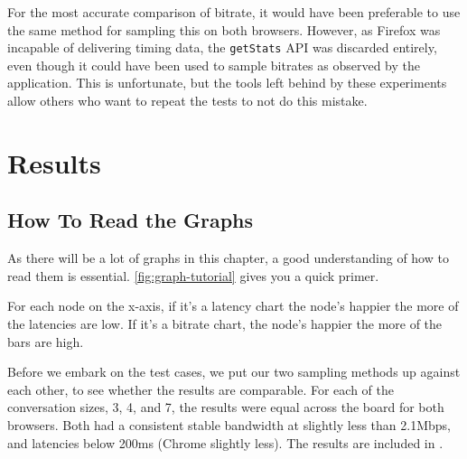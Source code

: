 For the most accurate comparison of bitrate, it would have been preferable to use the same method for sampling this on both browsers. However, as Firefox was incapable of delivering timing data, the \texttt{getStats} API was discarded entirely, even though it could have been used to sample bitrates as observed by the application. This is unfortunate, but the tools left behind by these experiments allow others who want to repeat the tests to not do this mistake.


\section{Results}

\subsection{How To Read the Graphs}

As there will be a lot of graphs in this chapter, a good understanding of how to read them is essential. \autoref{fig:graph-tutorial} gives you a quick primer.


For each node on the x-axis, if it's a latency chart the node's happier the more of the latencies are low. If it's a bitrate chart, the node's happier the more of the bars are high.

Before we embark on the test cases, we put our two sampling methods up against each other, to see whether the results are comparable. For each of the conversation sizes, 3, 4, and 7, the results were equal across the board for both browsers. Both had a consistent stable bandwidth at slightly less than 2.1Mbps, and latencies below 200ms (Chrome slightly less). The results are included in .








